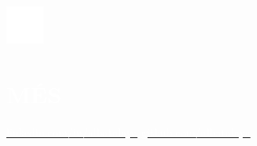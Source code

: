 \documentclass[../main.tex]{subfiles}
\begin{document}
    \hspace*{0.4cm}
    \begin{minipage}[t]{1.75cm}
        \vspace*{1cm}\includegraphics[width=1.25cm]{assets/more.png}
    \end{minipage}
    \begin{minipage}[t]{5cm}

        \vspace*{0.75cm}
        \section*{\textcolor{white}{MÉS}}
        \vspace*{-0.25cm}
        \textcolor{white}{
            \vspace*{0.1cm}\underline{\href{https://www.linkedin.com/in/albatalaya}{\textcolor{white}{linkedin.com/in/albatalaya}}}
            \underline{\href{https://www.github.com/albatalaya}{\textcolor{white}{github.com/albatalaya}}}
        }
    \end{minipage}
\end{document}
